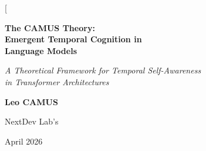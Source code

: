 \documentclass[10pt,twocolumn,letterpaper]{article}
\begin{document}
\twocolumn[
\begin{@twocolumnfalse}
\begin{center}
\vspace*{8mm}

{\LARGE\bfseries The CAMUS Theory:\\[4pt]
Emergent Temporal Cognition in\\[4pt]
Language Models\par}

\vspace{6mm}

{\large\itshape A Theoretical Framework for Temporal Self-Awareness\\
in Transformer Architectures\par}

\vspace{8mm}

{\large\bfseries Leo CAMUS\par}
\vspace{2mm}
{\normalsize NextDev Lab's\par}
\vspace{2mm}
{\small April 2026\par}

\vspace{8mm}

\begin{minipage}{0.92\textwidth}
\renewcommand{\abstractnamefont}{\normalfont\bfseries\large}
\renewcommand{\abstracttextfont}{\normalfont\small}
\begin{abstract}
Current Large Language Models (LLMs) based on the Transformer architecture process information in a fundamentally atemporal manner. Despite remarkable capabilities in language understanding and generation, these models lack any intrinsic representation of time---treating a token generated in 2~milliseconds identically to one requiring 200~milliseconds of computation, and remaining entirely blind to the temporal dynamics of their own inference process.

We propose the \textbf{CAMUS Theory}: by integrating a 5-component temporal vector $\mathbf{T}(t) = (\delta_{\text{prev}},\, \delta_{\text{session}},\, \tau_{\text{inf}},\, \omega_{\text{context}},\, \rho_{\text{rate}})$ into the training representation of each token, a Transformer model will develop \emph{emergent temporal cognition} structurally analogous to biological neural mechanisms.


\end{abstract}
\end{minipage}
\end{center}
\end{@twocolumnfalse}
\end{document}
